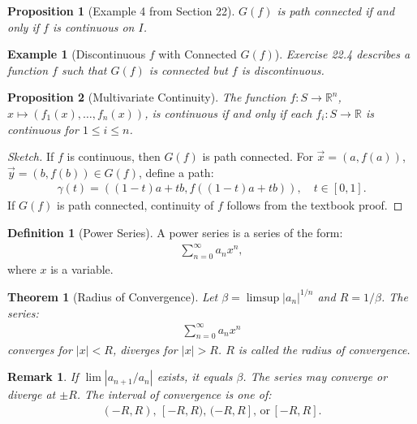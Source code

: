 \documentclass[7pt]{article}
\theoremstyle{definition}
\newtheorem{definition}{Definition}
\theoremstyle{plain}
\newtheorem{theorem}{Theorem}
\newtheorem{proposition}{Proposition}
\newtheorem{example}{Example}
\newtheorem{remark}{Remark}
\begin{document}
\begin{proposition}[Example 4 from Section 22]
$ G(f) $ is path connected if and only if $ f $ is continuous on $ I $.
\end{proposition}

\begin{example}[Discontinuous $ f $ with Connected $ G(f) $]
Exercise 22.4 describes a function $ f $ such that $ G(f) $ is connected but $ f $ is discontinuous.
\end{example}

\begin{proposition}[Multivariate Continuity]
The function $ f : S \to \mathbb{R}^n $, $ x \mapsto (f_1(x), \ldots, f_n(x)) $, is continuous if and only if each $ f_i : S \to \mathbb{R} $ is continuous for $ 1 \leq i \leq n $.
\end{proposition}

\begin{proof}[Sketch]
If $ f $ is continuous, then $ G(f) $ is path connected. For $ \vec{x} = (a, f(a)) $, $ \vec{y} = (b, f(b)) \in G(f) $, define a path:
\begin{align}
\gamma(t) = ((1-t)a + tb, f((1-t)a + tb)), \quad t \in [0, 1].
\end{align}
If $ G(f) $ is path connected, continuity of $ f $ follows from the textbook proof.
\end{proof}

\begin{definition}[Power Series]
A power series is a series of the form:
\begin{align}
\sum_{n=0}^\infty a_n x^n,
\end{align}
where $ x $ is a variable.
\end{definition}

\begin{theorem}[Radius of Convergence]
Let $ \beta = \limsup |a_n|^{1/n} $ and $ R = 1/\beta $. The series:
\begin{align}
\sum_{n=0}^\infty a_n x^n
\end{align}
converges for $ |x| < R $, diverges for $ |x| > R $. $ R $ is called the radius of convergence.
\end{theorem}

\begin{remark}
If $ \lim |a_{n+1}/a_n| $ exists, it equals $ \beta $. The series may converge or diverge at $ \pm R $. The interval of convergence is one of:
\begin{align}
(-R, R), \, [-R, R), \, (-R, R], \, \text{or} \, [-R, R].
\end{align}
\end{remark}
\end{document}
